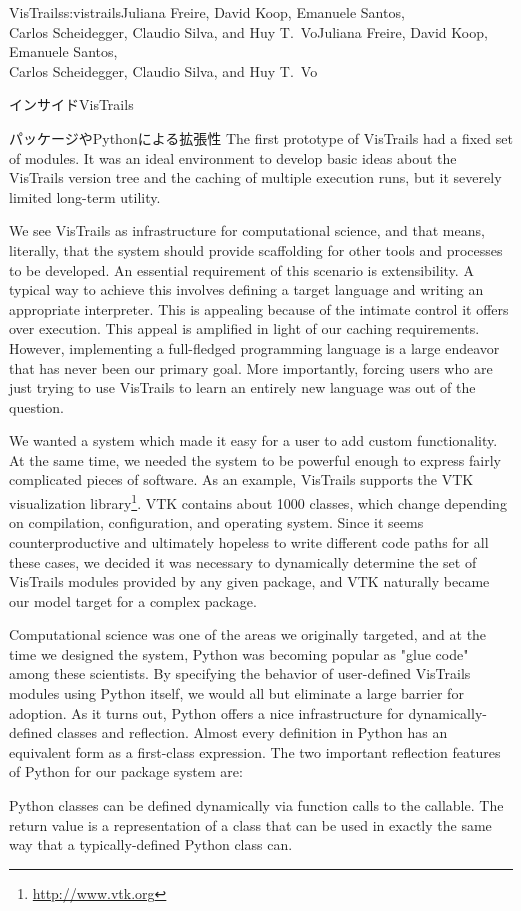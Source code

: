 \begin{aosachaptertoc}{VisTrails}{s:vistrails}{Juliana Freire, David Koop, Emanuele Santos, \\ Carlos Scheidegger, Claudio Silva, and Huy T.\ Vo}{Juliana Freire, David Koop, Emanuele Santos, \\ \hspace*{0.9cm} Carlos Scheidegger, Claudio Silva, and Huy T.\ Vo}
\begin{aosasect1}{インサイドVisTrails}
\begin{aosasect2}{パッケージやPythonによる拡張性}
The first prototype of VisTrails had a fixed set of modules. It was an
ideal environment to develop basic ideas about the VisTrails version
tree and the caching of multiple execution runs, but it severely
limited long-term utility.

We see VisTrails as infrastructure for computational science, and that
means, literally, that the system should provide scaffolding for other
tools and processes to be developed. An essential requirement of this
scenario is extensibility.  A typical way to achieve this involves
defining a target language and writing an appropriate
interpreter. This is appealing because of the intimate control it
offers over execution. This appeal is amplified in light of our
caching requirements.  However, implementing a full-fledged
programming language is a large endeavor that has never been our
primary goal. More importantly, forcing users who are just trying to
use VisTrails to learn an entirely new language was out of the
question.

We wanted a system which made it easy for a user to add custom
functionality. At the same time, we needed the system to be powerful
enough to express fairly complicated pieces of software. As an
example, VisTrails supports the VTK visualization library\footnote{\url{http://www.vtk.org}}. VTK
contains about 1000 classes, which change depending on compilation,
configuration, and operating system. Since it seems counterproductive
and ultimately hopeless to write different code paths for all these
cases, we decided it was necessary to dynamically determine the set of
VisTrails modules provided by any given package, and VTK naturally
became our model target for a complex package.

Computational science was one of the areas we originally targeted, and
at the time we designed the system, Python was becoming popular as
"glue code" among these scientists. By specifying the behavior of
user-defined VisTrails modules using Python itself, we would all but
eliminate a large barrier for adoption.  As it turns out, Python
offers a nice infrastructure for dynamically-defined classes and
reflection. Almost every definition in Python has an equivalent form
as a first-class expression. The two important reflection features of
Python for our package system are:

\begin{aosaitemize}

  \item Python classes can be defined dynamically via function calls to
  the  callable. The return value is a representation of a
  class that can be used in exactly the same way that a
  typically-defined Python class can.


\end{aosaitemize}
\end{aosasect2}
\end{aosasect1}
\end{aosachaptertoc}
